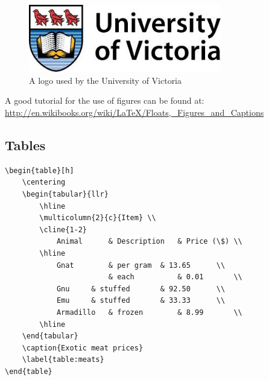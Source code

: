 \documentclass[12pt]{article}
\begin{document}
\begin{figure}[h] 	%
	\centering		%
	\includegraphics[width=0.75\textwidth]{Uvic_logo} 	
	\caption{A logo used by the University of Victoria}
	\label{fig:uvic_logo}
\end{figure}

A good tutorial for the use of figures can be found at: \url{http://en.wikibooks.org/wiki/LaTeX/Floats,_Figures_and_Captions}

\pagebreak
\subsection{Tables}\label{sec:tables}
\begin{verbatim}
\begin{table}[h]
	\centering
	\begin{tabular}{llr}
		\hline
		\multicolumn{2}{c}{Item} \\
		\cline{1-2}
			Animal   	& Description 	& Price (\$) \\
		\hline
			Gnat		& per gram	& 13.65      \\
				        & each       	& 0.01       \\
			Gnu		& stuffed     	& 92.50      \\
			Emu		& stuffed		& 33.33      \\
			Armadillo	& frozen		& 8.99       \\
		\hline
	\end{tabular}
	\caption{Exotic meat prices}
	\label{table:meats}
\end{table}
\end{verbatim}
\end{document}
